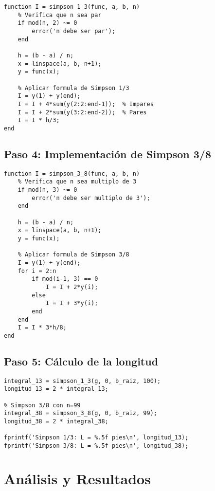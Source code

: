 \documentclass[conference]{IEEEtran}
\begin{document}
\begin{lstlisting}[caption={Función del método Simpson 1/3}]
function I = simpson_1_3(func, a, b, n)
    % Verifica que n sea par
    if mod(n, 2) ~= 0
        error('n debe ser par');
    end
    
    h = (b - a) / n;
    x = linspace(a, b, n+1);
    y = func(x);
    
    % Aplicar formula de Simpson 1/3
    I = y(1) + y(end);
    I = I + 4*sum(y(2:2:end-1));  % Impares
    I = I + 2*sum(y(3:2:end-2));  % Pares
    I = I * h/3;
end
\end{lstlisting}

\subsection{Paso 4: Implementación de Simpson 3/8}

\begin{lstlisting}[caption={Función del método Simpson 3/8}]
function I = simpson_3_8(func, a, b, n)
    % Verifica que n sea multiplo de 3
    if mod(n, 3) ~= 0
        error('n debe ser multiplo de 3');
    end
    
    h = (b - a) / n;
    x = linspace(a, b, n+1);
    y = func(x);
    
    % Aplicar formula de Simpson 3/8
    I = y(1) + y(end);
    for i = 2:n
        if mod(i-1, 3) == 0
            I = I + 2*y(i);
        else
            I = I + 3*y(i);
        end
    end
    I = I * 3*h/8;
end
\end{lstlisting}

\subsection{Paso 5: Cálculo de la longitud}

\begin{lstlisting}[caption={Calcular longitud con ambos métodos}]
% Simpson 1/3 con n=100
integral_13 = simpson_1_3(g, 0, b_raiz, 100);
longitud_13 = 2 * integral_13;

% Simpson 3/8 con n=99
integral_38 = simpson_3_8(g, 0, b_raiz, 99);
longitud_38 = 2 * integral_38;

fprintf('Simpson 1/3: L = %.5f pies\n', longitud_13);
fprintf('Simpson 3/8: L = %.5f pies\n', longitud_38);
\end{lstlisting}

\section{Análisis y Resultados}
\end{document}

